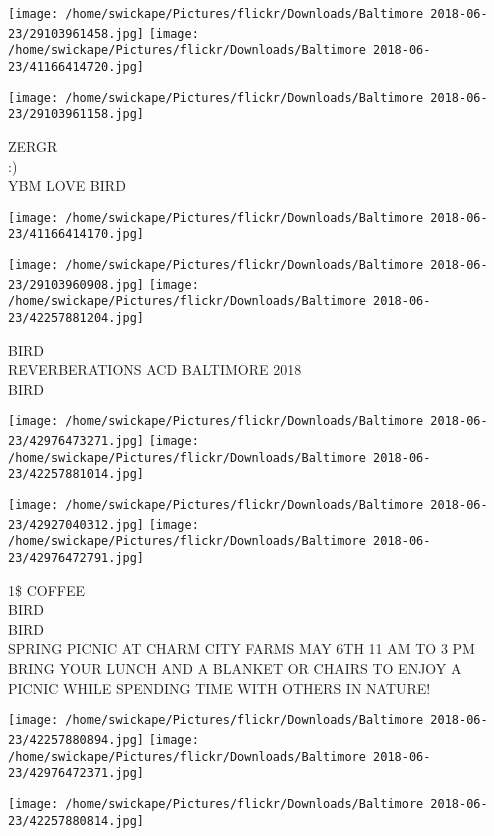 \documentclass[10pt,letterpaper]{article}
\begin{document}
\texttt{[image: /home/swickape/Pictures/flickr/Downloads/Baltimore 2018-06-23/29103961458.jpg]}
\texttt{[image: /home/swickape/Pictures/flickr/Downloads/Baltimore 2018-06-23/41166414720.jpg]}

\texttt{[image: /home/swickape/Pictures/flickr/Downloads/Baltimore 2018-06-23/29103961158.jpg]}

ZERGR\\
:)\\
YBM LOVE BIRD\\
\pagebreak

\texttt{[image: /home/swickape/Pictures/flickr/Downloads/Baltimore 2018-06-23/41166414170.jpg]}

\vspace{0.25in}
\texttt{[image: /home/swickape/Pictures/flickr/Downloads/Baltimore 2018-06-23/29103960908.jpg]}
\texttt{[image: /home/swickape/Pictures/flickr/Downloads/Baltimore 2018-06-23/42257881204.jpg]}

BIRD\\
REVERBERATIONS ACD BALTIMORE 2018\\
BIRD\\
\pagebreak

\texttt{[image: /home/swickape/Pictures/flickr/Downloads/Baltimore 2018-06-23/42976473271.jpg]}
\texttt{[image: /home/swickape/Pictures/flickr/Downloads/Baltimore 2018-06-23/42257881014.jpg]}

\texttt{[image: /home/swickape/Pictures/flickr/Downloads/Baltimore 2018-06-23/42927040312.jpg]}
\texttt{[image: /home/swickape/Pictures/flickr/Downloads/Baltimore 2018-06-23/42976472791.jpg]}

1\$ COFFEE\\
BIRD\\
BIRD\\
SPRING PICNIC AT CHARM CITY FARMS MAY 6TH 11 AM TO 3 PM BRING YOUR LUNCH AND A BLANKET OR CHAIRS TO ENJOY A PICNIC WHILE SPENDING TIME WITH OTHERS IN NATURE!\\
\pagebreak

\texttt{[image: /home/swickape/Pictures/flickr/Downloads/Baltimore 2018-06-23/42257880894.jpg]}
\texttt{[image: /home/swickape/Pictures/flickr/Downloads/Baltimore 2018-06-23/42976472371.jpg]}

\texttt{[image: /home/swickape/Pictures/flickr/Downloads/Baltimore 2018-06-23/42257880814.jpg]}
\end{document}
